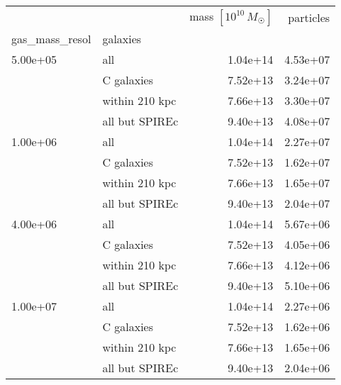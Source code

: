 \begin{tabular}{llrr}
\toprule
         &           &     mass \([10^{10}\,M_{\astrosun}]\) &  particles \\
gas\_mass\_resol & galaxies &          &            \\
\midrule
5.00e+05 & all & 1.04e+14 &   4.53e+07 \\
         & C galaxies & 7.52e+13 &   3.24e+07 \\
         & within 210 kpc & 7.66e+13 &   3.30e+07 \\
         & all but SPIREc & 9.40e+13 &   4.08e+07 \\
\midrule
1.00e+06 & all & 1.04e+14 &   2.27e+07 \\
         & C galaxies & 7.52e+13 &   1.62e+07 \\
         & within 210 kpc & 7.66e+13 &   1.65e+07 \\
         & all but SPIREc & 9.40e+13 &   2.04e+07 \\
\midrule
4.00e+06 & all & 1.04e+14 &   5.67e+06 \\
         & C galaxies & 7.52e+13 &   4.05e+06 \\
         & within 210 kpc & 7.66e+13 &   4.12e+06 \\
         & all but SPIREc & 9.40e+13 &   5.10e+06 \\
\midrule
1.00e+07 & all & 1.04e+14 &   2.27e+06 \\
         & C galaxies & 7.52e+13 &   1.62e+06 \\
         & within 210 kpc & 7.66e+13 &   1.65e+06 \\
         & all but SPIREc & 9.40e+13 &   2.04e+06 \\
\bottomrule
\end{tabular}
